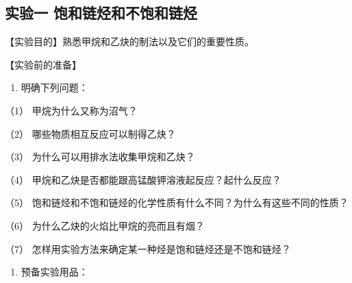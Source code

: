 \subsection{实验一 饱和链烃和不饱和链烃}

【实验目的】熟悉甲烷和乙炔的制法以及它们的重要性质。

【实验前的准备】

\begin{enumerate}
\item
  明确下列问题：
\end{enumerate}

（1） 甲烷为什么又称为沼气？

（2） 哪些物质相互反应可以制得乙炔？

（3） 为什么可以用排水法收集甲烷和乙炔？

（4） 甲烷和乙炔是否都能跟高锰酸钾溶液起反应？起什么反应？

（5） 饱和链烃和不饱和链烃的化学性质有什么不同？为什么有这些不同的性质？

（6） 为什么乙炔的火焰比甲烷的亮而且有烟？

（7） 怎样用实验方法来确定某一种烃是饱和链烃还是不饱和链烃？

\begin{enumerate}[start=2]
\item
  预备实验用品：
\end{enumerate}

